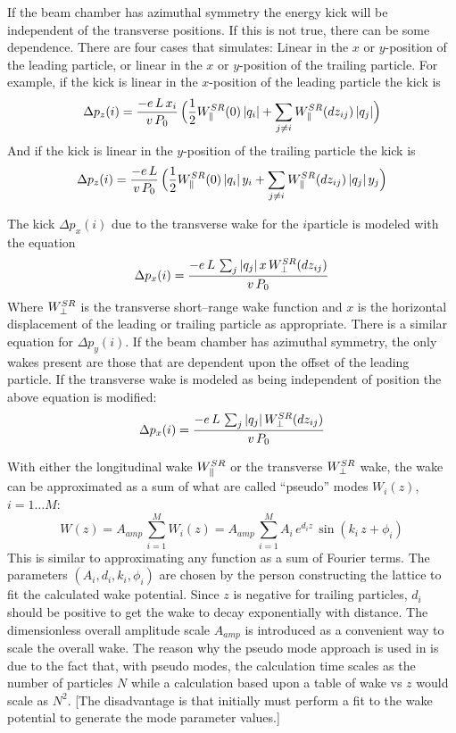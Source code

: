 If the beam chamber has azimuthal symmetry the energy kick will be independent of the transverse
positions. If this is not true, there can be some dependence. There are four cases that \bmad
simulates: Linear in the $x$ or $y$-position of the leading particle, or linear in the $x$ or
$y$-position of the trailing particle. For example, if the kick is linear in the $x$-position of the
leading particle the kick is
\begin{equation}
  \Delta p_z(i) = \frac{-e \, L \, x_i}{v \, P_0} \, \Bigl( \frac{1}{2}W^{SR}_\parallel(0) \,  |q_i| +
        \sum_{j \ne i} W^{SR}_\parallel(dz_{ij}) \, |q_j| \Bigr)
  \label{delvp2}
\end{equation}
And if the kick is linear in the $y$-position of the trailing particle the kick is
\begin{equation}
  \Delta p_z(i) = \frac{-e \, L}{v \, P_0} \, \Bigl( \frac{1}{2}W^{SR}_\parallel(0) \,  |q_i| \, y_i +
        \sum_{j \ne i} W^{SR}_\parallel(dz_{ij}) \, |q_j| \, y_j \Bigr)
  \label{delvp3}
\end{equation}

The kick $\Delta p_x(i)$ due to the transverse wake for the $i$\Th particle is modeled with the
equation
\begin{equation}
  \Delta p_x(i) = \frac{-e \, L \, \sum_j |q_j| \, x \, W^{SR}_\perp(dz_{ij})}{v \, P_0}
  \label{pelqxw1}
\end{equation}
Where $W^{SR}_\perp$ is the transverse short--range wake function and $x$ is the horizontal displacement of
the leading or trailing particle as appropriate. There is a similar equation for $\Delta p_y(i)$.
If the beam chamber has azimuthal symmetry, the only wakes present are those that are dependent upon
the offset of the leading particle. If the transverse wake is modeled as being independent of
position the above equation is modified:
\begin{equation}
  \Delta p_x(i) = \frac{-e \, L \, \sum_j |q_j| \, W^{SR}_\perp(dz_{ij})}{v \, P_0}
  \label{pelqxw2}
\end{equation}


With either the longitudinal wake $W^{SR}_\parallel$ or the transverse $W^{SR}_\perp$ wake, the wake can be
approximated as a sum of what are called ``pseudo'' modes $W_i(z)$, $i = 1 \ldots M$:
\begin{equation}
  W(z) = A_{amp} \, \sum_{i = 1}^M W_i(z)
  = A_{amp} \, \sum_{i = 1}^M A_i \, e^{d_i z} \, \sin (k_i \, z + \phi_i)
  \label{wadzk}
\end{equation}
This is similar to approximating any function as a sum of Fourier terms. The parameters $(A_i, d_i,
k_i, \phi_i)$ are chosen by the person constructing the lattice to fit the calculated wake
potential. Since $z$ is negative for trailing particles, $d_i$ should be positive to get the wake to
decay exponentially with distance. The dimensionless overall amplitude scale $A_{amp}$ is introduced
as a convenient way to scale the overall wake. The reason why the pseudo mode approach is used in \bmad is
due to the fact that, with pseudo modes, the calculation time scales as the number of particles $N$
while a calculation based upon a table of wake vs $z$ would scale as $N^2$. [The disadvantage is
that initially must perform a fit to the wake potential to generate the mode parameter
values.]

